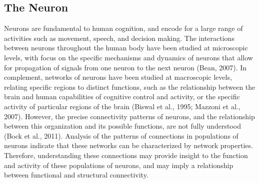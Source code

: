 \documentclass[11pt]{article}
\begin{document}
\subsection{The Neuron}
Neurons are fundamental to human cognition, and encode for a large range of activities such as movement, speech, and decision making. The interactions between neurons throughout the human body have been studied at microscopic levels, with focus on the specific mechanisms and dynamics of neurons that allow for propagation of signals from one neuron to the next neuron (Bean, 2007). In complement, networks of neurons have been studied at macroscopic levels, relating specific regions to distinct functions, such as the relationship between the brain and human capabilities of cognitive control and activity, or the specific activity of particular regions of the brain (Biswal et al., 1995; Mazzoni et al., 2007). However, the precise connectivity patterns of neurons, and the relationship between this organization and its possible functions, are not fully understood (Bock et al., 2011). Analysis of the patterns of connections in populations of neurons indicate that these networks can be characterized by network properties. Therefore, understanding these connections may provide insight to the function and activity of these populations of neurons, and may imply a relationship between functional and structural connectivity.\par

\end{document}
